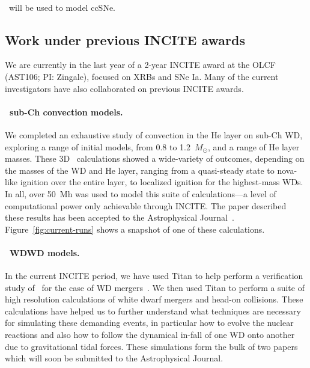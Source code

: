 \documentclass[11pt,letterpaper,english]{article}
\begin{document}
\paragraph{\chimera}
%
\chimera\ will be used to model ccSNe.  

\subsection{Work under previous INCITE awards}

We are currently in the last year of a 2-year INCITE award at the OLCF
(AST106; PI: Zingale), focused on XRBs and SNe Ia.  Many of the
current investigators have also collaborated on previous INCITE
awards.  

\paragraph{\maestro\ sub-Ch convection models.}
%
We completed an exhaustive study of convection in the He layer
on  sub-Ch WD, exploring a range of initial
models, from 0.8 to 1.2~$M_\odot$, and a range of He layer masses.
These 3D \maestro\ calculations showed a wide-variety of outcomes,
depending on the masses of the WD and He layer, ranging from a
quasi-steady state to nova-like ignition over the entire layer, to
localized ignition for the highest-mass WDs.  In all, over 50~Mh was
used to model this suite of calculations---a level of computational
power only achievable through INCITE.  The paper described these
results has been accepted to the Astrophysical
Journal~\cite{jacobs:2016}.  Figure~\ref{fig:current-runs} shows a
snapshot of one of these calculations.

\paragraph{\castro\ WDWD models.}
%
In the current INCITE period, we have used Titan to help perform
a verification study of \castro\ for the case of WD mergers~\cite{katz:2016}.
We then used Titan to perform a suite of high resolution calculations
of white dwarf mergers and head-on collisions. These calculations have
helped us to further understand what techniques are necessary for
simulating these demanding events, in particular how to evolve the
nuclear reactions and also how to follow the dynamical in-fall of
one WD onto another due to gravitational tidal forces. These simulations
form the bulk of two papers which will soon be submitted to the
Astrophysical Journal.
\end{document}
